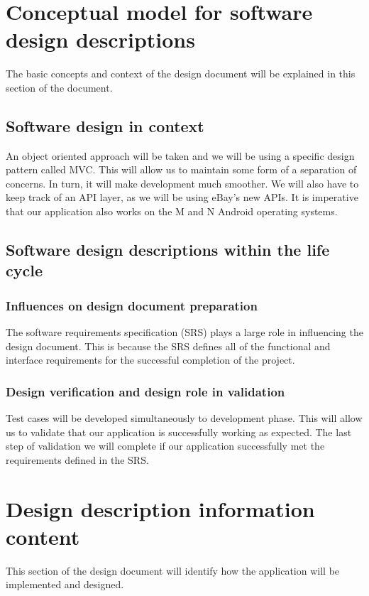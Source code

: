 \documentclass[journal,compsoc, 10pt, draftclsnofoot, onecolumn]{IEEEtran}
\begin{document}
\section{Conceptual model for software design descriptions}
The basic concepts and context of the design document will be explained in this 
section of the document.

\subsection{Software design in context}
An object oriented approach will be taken and we will be using a specific 
design pattern called MVC. This will allow us to maintain some form of a 
separation of concerns. In turn, it will make development much smoother. We will
 also have to keep track of an API layer, as we will be using eBay's new APIs. 
It is imperative that our application also works on the M and N Android 
operating systems.

\subsection{Software design descriptions within the life cycle}
\subsubsection{Influences on design document preparation}
The software requirements specification (SRS) plays a large role in influencing 
the design document. This is because the SRS defines all of the functional and 
interface requirements for the successful completion of the project.

\subsubsection{Design verification and design role in validation}
Test cases will be developed simultaneously to development phase. This will 
allow us to validate that our application is successfully working as expected. 
The last step of validation we will complete if our application successfully 
met the requirements defined in the SRS.


\section{Design description information content}
This section of the design document will identify how the application will be 
implemented and designed. 
\end{document}
